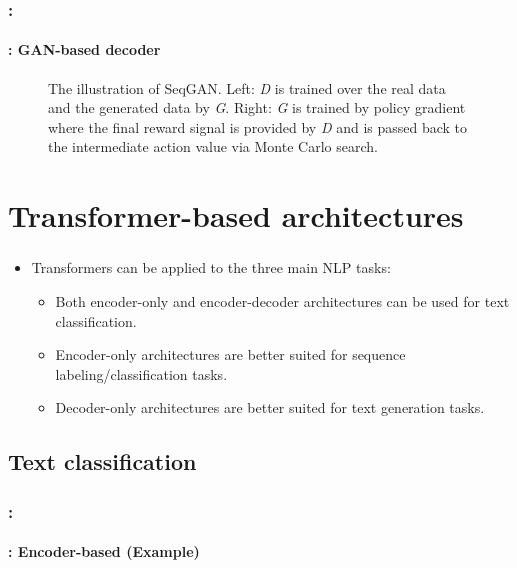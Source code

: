 \documentclass[xcolor=table]{beamer}
\begin{document}
\begin{frame}
	\frametitle{\insertshortsubtitle: \insertsection}
	\framesubtitle{\insertsubsection: GAN-based decoder}
	
	\begin{figure}
		\caption{The illustration of SeqGAN. 
			Left: \textit{D} is trained over the real data and the generated data by \textit{G}. 
			Right: \textit{G} is trained by policy gradient where the final reward signal is provided
			by \textit{D} and is passed back to the intermediate action value via Monte Carlo search. \cite{SeqGAN}}
	\end{figure}
	
\end{frame}


\section{Transformer-based architectures}


\begin{frame}
	\frametitle{\insertshortsubtitle}
	\framesubtitle{\insertsection}
	
	\begin{itemize}
		\item Transformers can be applied to the three main NLP tasks:
		\begin{itemize}
			\item Both encoder-only and encoder-decoder architectures can be used for text classification.
			\item Encoder-only architectures are better suited for sequence labeling/classification tasks.
			\item Decoder-only architectures are better suited for text generation tasks.
		\end{itemize}
	\end{itemize}
	
	
\end{frame}


\subsection{Text classification}

\begin{frame}
	\frametitle{\insertshortsubtitle: \insertsection}
	\framesubtitle{\insertsubsection: Encoder-based (Example)}
	
	\begin{center}
	\end{center}
	
\end{frame}
\end{document}
